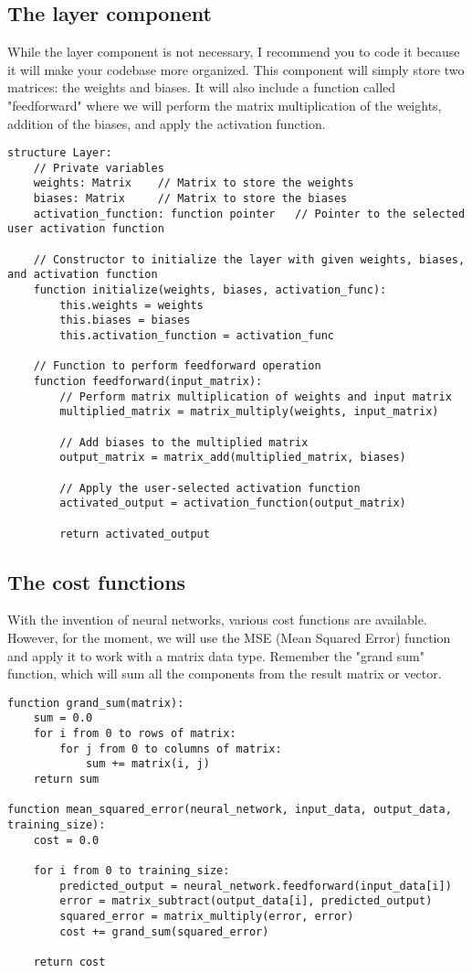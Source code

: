 \subsection{The layer component}
While the layer component is not necessary, I recommend you to code it because it will make your codebase
more organized. This component will simply store two matrices: the weights and biases. It will also include a
function called "feedforward" where we will perform the matrix multiplication of the weights, addition of the
biases, and apply the activation function.
\begin{verbatim}
structure Layer:
    // Private variables
    weights: Matrix    // Matrix to store the weights
    biases: Matrix     // Matrix to store the biases
    activation_function: function pointer   // Pointer to the selected user activation function

    // Constructor to initialize the layer with given weights, biases, and activation function
    function initialize(weights, biases, activation_func):
        this.weights = weights
        this.biases = biases
        this.activation_function = activation_func

    // Function to perform feedforward operation
    function feedforward(input_matrix):
        // Perform matrix multiplication of weights and input matrix
        multiplied_matrix = matrix_multiply(weights, input_matrix)

        // Add biases to the multiplied matrix
        output_matrix = matrix_add(multiplied_matrix, biases)

        // Apply the user-selected activation function
        activated_output = activation_function(output_matrix)

        return activated_output
\end{verbatim}

\subsection{The cost functions}
With the invention of neural networks, various cost functions are available. However, for the moment, we
will use the MSE (Mean Squared Error) function and apply it to work with a matrix data type. Remember the
"grand sum" function, which will sum all the components from the result matrix or vector.
\begin{verbatim}
function grand_sum(matrix):
    sum = 0.0
    for i from 0 to rows of matrix:
        for j from 0 to columns of matrix:
            sum += matrix(i, j)
    return sum

function mean_squared_error(neural_network, input_data, output_data, training_size):
    cost = 0.0

    for i from 0 to training_size:
        predicted_output = neural_network.feedforward(input_data[i])
        error = matrix_subtract(output_data[i], predicted_output)
        squared_error = matrix_multiply(error, error)
        cost += grand_sum(squared_error)

    return cost
\end{verbatim}
